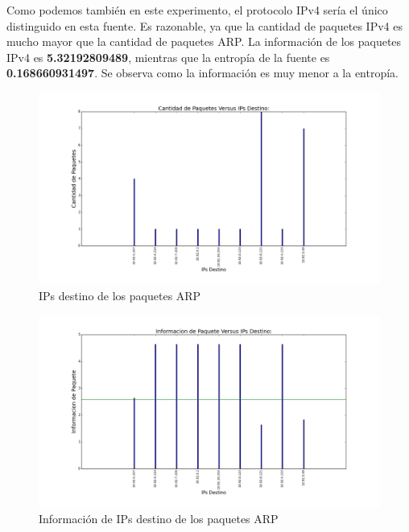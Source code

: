 Como podemos también en este experimento, el protocolo IPv4 sería el único distinguido en esta fuente. Es razonable, ya que la cantidad de paquetes IPv4 es mucho mayor que la cantidad de paquetes ARP. La información de los paquetes IPv4 es \textbf{5.32192809489}, mientras que la entropía de la fuente es \textbf{0.168660931497}. Se observa como la información es muy menor a la entropía.

\begin{figure}[H]
       \centering
       \includegraphics[width=1\textwidth]{../resultados/subte/histogram_dst.png}
       \caption{IPs destino de los paquetes ARP}
       \label{red-Starbucks-dst}
\end{figure}

\begin{figure}[H]
       \centering
       \includegraphics[width=1\textwidth]{../resultados/subte/histogram_dst_information.png}
       \caption{Información de IPs destino de los paquetes ARP}
       \label{red-Starbucks-dst-information}
\end{figure}


